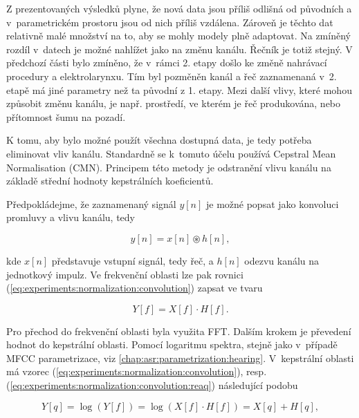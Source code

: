 Z prezentovaných výsledků plyne, že nová data jsou příliš odlišná od původních a v~parametrickém prostoru jsou od nich příliš vzdálena.
Zároveň je těchto dat relativně malé množství na to, aby se mohly modely plně adaptovat.
Na zmíněný rozdíl v~datech je možné nahlížet jako na změnu kanálu.
Řečník je totiž stejný.
V předchozí části bylo zmíněno, že v~rámci 2. etapy došlo ke změně nahrávací procedury a elektrolarynxu.
Tím byl pozměněn kanál a řeč zaznamenaná v~2. etapě  má jiné parametry než ta původní z 1. etapy.
Mezi další vlivy, které mohou způsobit změnu kanálu, je např. prostředí, ve kterém je řeč produkována, nebo přítomnost šumu na pozadí.

K tomu, aby bylo možné použít všechna dostupná data, je tedy potřeba eliminovat vliv kanálu.
Standardně se  k~tomuto účelu používá Cepstral Mean Normalisation (CMN). Principem této metody je odstranění vlivu kanálu na základě střední hodnoty kepstrálních koeficientů.

Předpokládejme, že zaznamenaný signál $y[n]$ je možné popsat jako konvoluci promluvy a vlivu kanálu, tedy

\begin{equation}
  y\left[n\right] = x\left[n\right] \circledast h\left[n\right],
  \label{eq:experiments:normalization:convolution}
\end{equation}

\noindent kde $x\left[n\right]$ představuje vstupní signál, tedy řeč, a $h\left[n\right]$ odezvu kanálu na jednotkový impulz.
Ve frekvenční oblasti lze pak rovnici (\ref{eq:experiments:normalization:convolution}) zapsat ve tvaru

\begin{equation}
  Y\left[f\right] = X\left[f\right] \cdot H\left[f\right].
  \label{eq:experiments:normalization:convolution:reaq}
\end{equation}

\noindent Pro přechod do frekvenční oblasti byla využita FFT.
Dalším krokem je převedení hodnot do kepstrální oblasti.
Pomocí logaritmu spektra, stejně jako v~případě MFCC parametrizace, viz \ref{chap:asr:parametrization:hearing}. V~kepstrální oblasti má vzorec (\ref{eq:experiments:normalization:convolution}), resp. (\ref{eq:experiments:normalization:convolution:reaq}) následující podobu

\begin{equation}
  Y\left[q\right] = \log\left(Y\left[f\right]\right) = \log\left(X\left[f\right] \cdot H\left[f\right]\right) = X\left[q\right] + H\left[q\right],
\end{equation}

